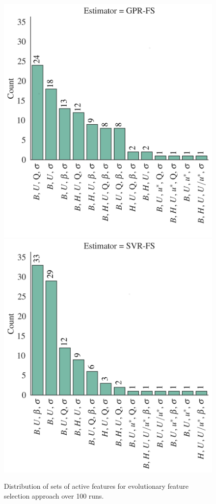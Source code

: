 \documentclass[a4paper,12pt, english]{article}
\begin{document}
\begin{figure}[!]
    \centering 
    \includegraphics[height=0.41\textheight]{./results/eml____300dpi_active_features_sets_gpr_fs__count}
    \includegraphics[height=0.41\textheight]{./results/eml____300dpi_active_features_sets_svr_fs__count}
    \caption{\label{fig:eml____300dpi_active_features_sets_count}
    Distribution of sets of  active features for evolutionary feature selection approach over 100 runs.}
\end{figure} 
\end{document}
